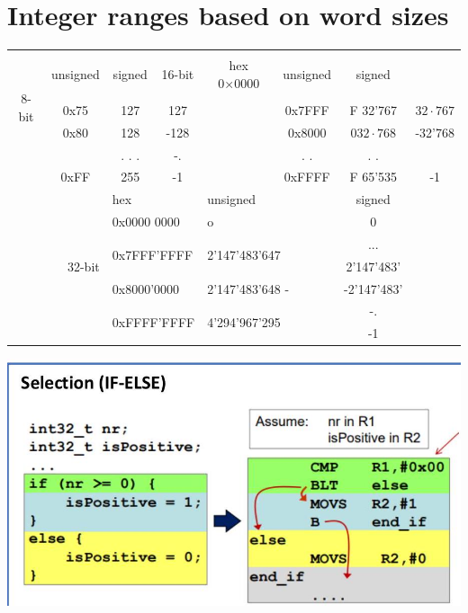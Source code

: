 \documentclass[10pt]{article}
\begin{document}
\section*{Integer ranges based on word sizes}
\begin{center}
\begin{tabular}{|c|c|c|c|c|c|c|c|}
\hline
\multirow[t]{6}{*}{8-bit} & \( \begin{gathered} \text { hex } \\ 0 \times 00 \end{gathered} \) & unsigned & signed & 16-bit & hex 0×0000 & unsigned & signed \\
\hline
 &  &  &  &  &  &  &  \\
\hline
 & 0x75 & 127 & 127 &  & 0x7FFF & F 32'767 & $32 \cdot 767$ \\
\hline
 & 0x80 & 128 & -128 &  & 0x8000 & $032 \cdot 768$ & -32'768 \\
\hline
 &  & . . . & -. &  & . . & . . &  \\
\hline
 & 0xFF & 255 & -1 &  & 0xFFFF & F 65'535 & -1 \\
\hline
\multicolumn{2}{|r|}{\multirow[t]{7}{*}{32-bit}} & \multicolumn{2}{|l|}{hex} & \multicolumn{2}{|l|}{unsigned} & signed &  \\
\hline
 &  & \multicolumn{2}{|l|}{0x0000 0000} & \multicolumn{2}{|l|}{o} & 0 &  \\
\hline
 &  & \multicolumn{2}{|l|}{\multirow[t]{2}{*}{0x7FFF'FFFF}} & \multicolumn{2}{|l|}{\multirow[t]{2}{*}{2'147'483'647}} & ... &  \\
\hline
 &  &  &  &  &  & 2'147'483' &  \\
\hline
 &  & \multicolumn{2}{|l|}{0x8000'0000} & \multicolumn{2}{|l|}{2'147'483'648 -} & -2'147'483' &  \\
\hline
 &  & \multicolumn{2}{|l|}{\multirow[t]{2}{*}{0xFFFF'FFFF}} & \multicolumn{2}{|l|}{\multirow[t]{2}{*}{4'294'967'295}} & -. &  \\
\hline
 &  &  &  &  &  & -1 &  \\
\hline
\end{tabular}
\end{center}

\begin{center}
\includegraphics[width=\linewidth]{images/2024_12_29_79e6b22f503fb7b4f718g-07(3)}
\end{center}
\end{document}
